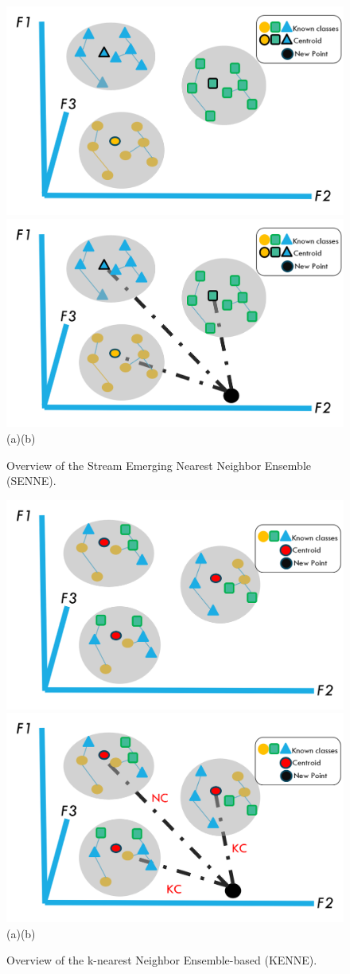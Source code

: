 \begin{figure}[!ht]
    \begin{center}
        \includegraphics[width=.49\textwidth]{3_State-of-the-art/fig/senne0.png} 
        \includegraphics[width=.49\textwidth]{3_State-of-the-art/fig/senne.png} 
        (a)\hspace{6.5cm}(b)
    \end{center}
    \caption{Overview of the Stream Emerging Nearest Neighbor Ensemble (SENNE).}
    \label{fig:SENNE}
    \end{figure}
    \vline
    \begin{figure}[!ht]    
        \begin{center}
            \includegraphics[width=.49\textwidth]{3_State-of-the-art/fig/kenne0.png} 
            \includegraphics[width=.49\textwidth]{3_State-of-the-art/fig/kenne.png}
            (a)\hspace{6.5cm}(b)
            \end{center}
    
        \caption{Overview of the k-nearest Neighbor Ensemble-based (KENNE).}
        \label{fig:KENNE}
        \end{figure}
        

